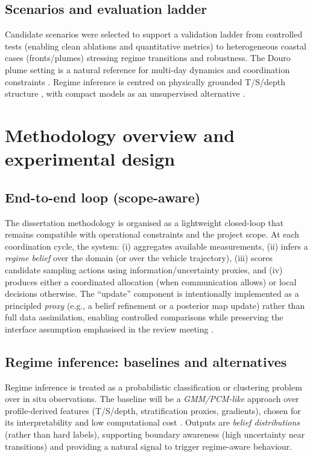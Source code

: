 \subsection{Scenarios and evaluation ladder}
Candidate scenarios were selected to support a validation ladder from controlled tests (enabling clean ablations and quantitative metrics)
to heterogeneous coastal cases (fronts/plumes) stressing regime transitions and robustness. The Douro plume setting is a natural reference
for multi-day dynamics and coordination constraints \parencite{dalfabbro2025douroplume}. Regime inference is centred on physically grounded
T/S/depth structure \parencite{ge2023watermasses}, with compact models as an unsupervised alternative \parencite{fossum2020compact}.

\section{Methodology overview and experimental design} \label{sec:method_overview}

\subsection{End-to-end loop (scope-aware)}
The dissertation methodology is organised as a lightweight closed-loop that remains compatible with operational constraints and the project scope.
At each coordination cycle, the system: (i) aggregates available measurements, (ii) infers a \emph{regime belief} over the domain (or over the
vehicle trajectory), (iii) scores candidate sampling actions using information/uncertainty proxies, and (iv) produces either a coordinated
allocation (when communication allows) or local decisions otherwise. The ``update'' component is intentionally implemented as a principled
\emph{proxy} (e.g., a belief refinement or a posterior map update) rather than full data assimilation, enabling controlled comparisons while
preserving the interface assumption emphasised in the review meeting \parencite{bernacchi2025closingloop,duarte2025geostatistical}.

\subsection{Regime inference: baselines and alternatives}
Regime inference is treated as a probabilistic classification or clustering problem over in situ observations.
The baseline will be a \emph{GMM/PCM-like} approach over profile-derived features (T/S/depth, stratification proxies, gradients), chosen for
its interpretability and low computational cost \parencite{ge2023watermasses}. Outputs are \emph{belief distributions} (rather than hard labels),
supporting boundary awareness (high uncertainty near transitions) and providing a natural signal to trigger regime-aware behaviour.

